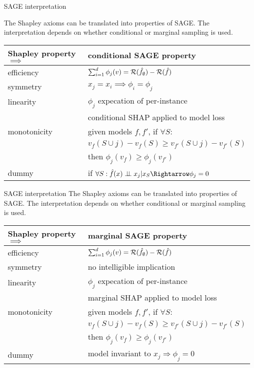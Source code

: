 \documentclass[11pt,compress,t,notes=noshow, aspectratio=169, xcolor=table]{beamer}
\begin{document}
\begin{vbframe}{SAGE interpretation}

The Shapley axioms can be translated into properties of SAGE. The interpretation depends on whether conditional or marginal sampling is used.
%
\begin{table}
  \centering
  \begin{tabular}{l | l }
  Shapley property $\implies$ & conditional SAGE property \\
  \hline
  efficiency & $\sum_{i=1}^d \phi_j(v) = \mathcal{R}(\hat{f}_\emptyset) - \mathcal{R}(\hat{f})$\\
  symmetry & $x_j = x_i \implies \phi_i = \phi_j$ \\
  linearity & $\phi_j$ expecation of per-instance\\
  & conditional SHAP applied to model loss\\
  monotonicity & given models $f, f'$, if  $\forall S:$\\
  &$v_f(S \cup j) - v_f(S) \geq v_{f'}(S \cup j) - v_{f'}(S)$ \\
  &then $\phi_j(v_f) \geq \phi_j(v_{f'})$\\
  dummy & if $\forall S: \fh(x) \indep x_j | x_S \Rightarrow \phi_j = 0$
  \end{tabular}
\end{table}

\end{vbframe}

\begin{vbframe}{SAGE interpretation}
%
The Shapley axioms can be translated into properties of SAGE. The interpretation depends on whether conditional or marginal sampling is used.
%
\begin{table}
  \centering
  \begin{tabular}{l | l }
  Shapley property $\implies$ & marginal SAGE property \\
  \hline
  efficiency & $\sum_{i=1}^d \phi_j(v) = \mathcal{R}(\hat{f}_\emptyset) - \mathcal{R}(\hat{f})$\\
  symmetry & no intelligible implication \\
  linearity & $\phi_j$ expecation of per-instance\\
  & marginal SHAP applied to model loss\\
  monotonicity & given models $f, f'$, if  $\forall S:$\\
  &$v_f(S \cup j) - v_f(S) \geq v_{f'}(S \cup j) - v_{f'}(S)$ \\
  &then $\phi_j(v_f) \geq \phi_j(v_{f'})$\\
  dummy & model invariant to $x_j \Rightarrow \phi_j = 0$\\
  \end{tabular}
\end{table}
%
\end{vbframe}
\end{document}
